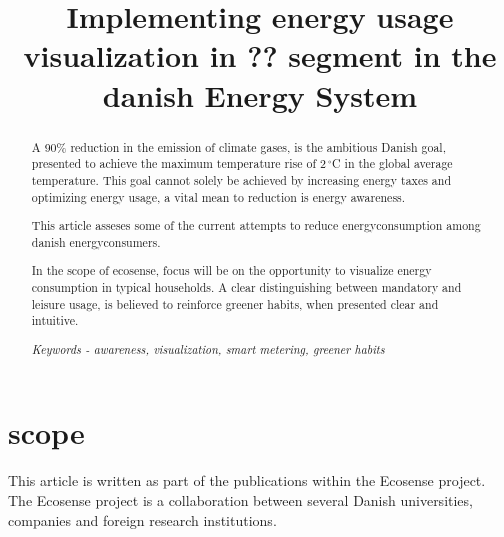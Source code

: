 \documentclass[conference]{IEEEtran}
\begin{document}
%
\title{Implementing energy usage visualization in ?? segment in the danish Energy System}


\author{
}









\maketitle


\begin{abstract}
A 90\% reduction in the emission of climate gases, is the ambitious Danish goal, presented to achieve the maximum temperature rise of 2$\,^{\circ}$C  in the global average temperature. This goal cannot solely be achieved by increasing energy taxes and optimizing energy usage, a vital mean to reduction is energy awareness. 

This article asseses some of the current attempts to reduce energyconsumption among danish energyconsumers.

In the scope of ecosense, focus will be on the opportunity to visualize energy consumption in typical households. A clear distinguishing between mandatory and leisure usage, is believed to reinforce greener habits, when presented clear and intuitive.

\textit{Keywords - awareness, visualization, smart metering, greener habits}
\end{abstract}

\section{scope}
This article is written as part of the publications within the Ecosense project. The Ecosense project is a collaboration between several Danish universities, companies and foreign research institutions. 
\end{document}

